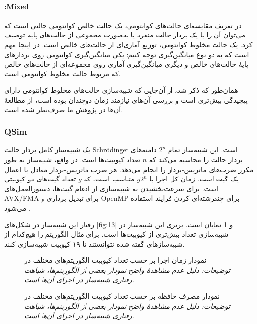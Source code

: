 \paragraph{:Mixed}
در تعریف مقایسه‌ای حالت‌های کوانتومی، یک حالت خالص کوانتومی حالتی است که می‌توان آن را با یک بردار حالت منفرد یا به‌صورت مجموعی از حالت‌های پایه توصیف کرد. یک حالت مخلوط کوانتومی، توزیع آماری‌ای از حالت‌های خالص است. در اینجا مهم است که به دو نوع میانگین‌گیری توجه کنیم: یکی میانگین‌گیری کوانتومی روی بردارهای پایهٔ حالت‌های خالص و دیگری میانگین‌گیری آماری روی مجموعه‌ای از حالت‌های خالص که مربوط حالت مخلوط کوانتومی است.

همان‌طور که ذکر شد، از آن‌جایی که شبیه‌سازی حالت‌های مخلوط کوانتومی دارای پیچیدگی بیش‌تری است و بررسی آن‌های نیازمند زمان دوچندان بوده است، از مطالعهٔ آن‌ها در پژوهش ما صرف‌نظر شده است.
\subsubsection{QSim}
یک شبیه‌ساز کامل بردار حالت Schrödinger است. این شبیه‌ساز تمام $2^n$ دامنه‌های بردار حالت را محاسبه می‌کند که $n$ تعداد کیوبیت‌ها است. در واقع، شبیه‌ساز به طور مکرر ضرب‌های ماتریس-بردار را انجام می‌دهد. هر ضرب ماتریس-بردار معادل با اعمال یک گیت است. زمان کل اجرا با $g2^n$ متناسب است، که $g$ تعداد گیت‌های دو کیوبیتی است. برای سرعت‌بخشیدن به شبیه‌سازی از ادغام گیت‌ها، دستورالعمل‌های AVX/FMA برای تبدیل برداری و OpenMP برای چندرشته‌ای کردن فرایند استفاده می‌شود
\cite{smelyanskiy_qhipster_2016}.

رفتار این شبیه‌ساز در شکل‌های \ref{fig:13} و \ref{fig:14} نمایان است. برتری این شبیه‌ساز در شبیه‌سازی تعداد بیش‌تری از کیوبیت‌ها است. برای مثال الگوریتم
را هیچ‌کدام از شبیه‌سازهای گفته شده نتوانستند تا ۱۹ کیوبیت شبیه‌سازی کنند.
\begin{figure}
	\centering
	\captionsetup{justification=centering}
	
	\caption[نمودار زمان اجرا ]{
		نمودار زمان اجرا بر حسب تعداد کیوبیت الگوریتم‌های مختلف در
		\newline \textit{
			توضیحات: دلیل عدم مشاهد‌هٔ واضح نمودار بعضی از الگوریتم‌ها، شباهت رفتاری شبیه‌ساز در اجرای آن‌ها است.
		}
	}
	\label{fig:13}
	\vspace{1cm}
	\captionsetup{justification=centering}
	
	\caption[نمودار مصرف حافظه ]{
		نمودار مصرف حافظه بر حسب تعداد کیوبیت الگوریتم‌های مختلف در
		\newline \textit{
			توضیحات: دلیل عدم مشاهد‌هٔ واضح نمودار بعضی از الگوریتم‌ها، شباهت رفتاری شبیه‌ساز در اجرای آن‌ها است.
		}
	}
	\label{fig:14}
\end{figure}

